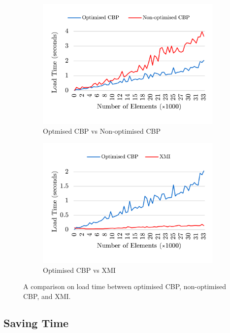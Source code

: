 \documentclass{llncs}
\begin{document}
\begin{figure}[ht]	
    \begin{subfigure}[t]{0.5\linewidth}
		\includegraphics[width=\linewidth]{loading_speed_conf}
		\caption{Optmised CBP vs Non-optimised CBP}\label{fig:loading_speed_conf}
	\end{subfigure}
	\hfill
	\begin{subfigure}[t]{0.5\linewidth}
		\includegraphics[width=\linewidth]{loading_speed_conf_ocbp_xmi}
		\caption{Optimised CBP vs XMI}\label{fig:loading_speed_conf_ocbp_xmi}		
	\end{subfigure}	
	\caption{A comparison on load time between optimised CBP, non-optimised CBP, and XMI.}
	\label{fig:loading_speed}
\end{figure}

\subsection{Saving Time}
\label{subsec:saving_time_test}
\end{document}
